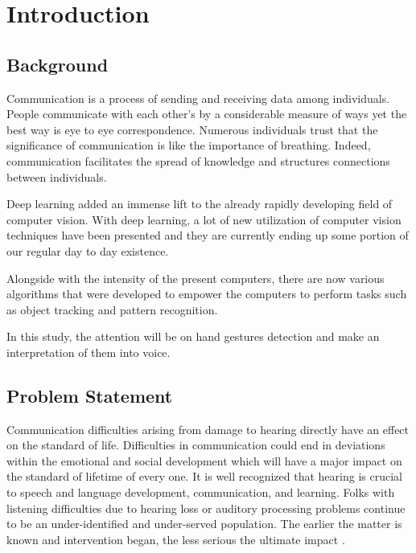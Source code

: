 \documentclass[12pt]{report}
\begin{document}
\setcounter{page}{2} 
\renewcommand{\contentsname}{Table of Contents}
\tableofcontents
\listoffigures
\listoftables
\newpage

\chapter{Introduction} 

\section{Background}
Communication is a process of sending and receiving data among individuals. 
People communicate with each other's by a considerable measure of ways yet the best way is eye to eye correspondence.
Numerous individuals trust that the significance of communication 
is like the importance of breathing. Indeed, communication facilitates the spread of knowledge
and structures connections between individuals. 

Deep learning added an immense lift to the already rapidly developing field of computer vision.
With deep learning, a lot of new utilization of computer vision techniques have been presented
and they are currently ending up some portion of our regular day to day existence.

Alongside with the intensity of the present computers, there are now various algorithms that were developed 
to empower the computers to perform tasks such as object tracking and pattern recognition. 

In this study, the attention will be on hand gestures detection and make an interpretation of them into voice.

\section{Problem Statement}
Communication difficulties arising from damage to hearing
directly have an effect on the standard of life. Difficulties in communication could
end in deviations within the emotional and social development which
will have a major impact on the standard of lifetime of every one.
It is well recognized that hearing is crucial to speech and language development, communication, and learning.
Folks with listening difficulties due to hearing loss or auditory processing problems
continue to be an under-identified and under-served population. The
earlier the matter is known and intervention began, the less
serious the ultimate impact \cite{AFrajtag12017}.
\end{document}
